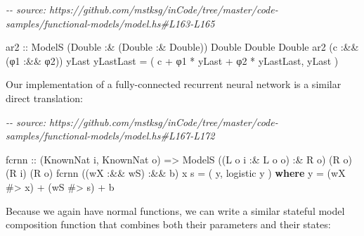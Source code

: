 \documentclass[]{article}
\newenvironment{Shaded}{}{}
\newcommand{\CommentTok}[1]{\textcolor[rgb]{0.38,0.63,0.69}{\textit{#1}}}
\newcommand{\DataTypeTok}[1]{\textcolor[rgb]{0.56,0.13,0.00}{#1}}
\newcommand{\KeywordTok}[1]{\textcolor[rgb]{0.00,0.44,0.13}{\textbf{#1}}}
\newcommand{\NormalTok}[1]{#1}
\newcommand{\OperatorTok}[1]{\textcolor[rgb]{0.40,0.40,0.40}{#1}}
\newcommand{\OtherTok}[1]{\textcolor[rgb]{0.00,0.44,0.13}{#1}}
\begin{document}
\begin{Shaded}
\begin{Highlighting}[]
\CommentTok{{-}{-} source: https://github.com/mstksg/inCode/tree/master/code{-}samples/functional{-}models/model.hs\#L163{-}L165}

\OtherTok{ar2 ::} \DataTypeTok{ModelS}\NormalTok{ (}\DataTypeTok{Double} \OperatorTok{:\&}\NormalTok{ (}\DataTypeTok{Double} \OperatorTok{:\&} \DataTypeTok{Double}\NormalTok{)) }\DataTypeTok{Double} \DataTypeTok{Double} \DataTypeTok{Double}
\NormalTok{ar2 (c }\OperatorTok{:\&\&}\NormalTok{ (φ1 }\OperatorTok{:\&\&}\NormalTok{ φ2)) yLast yLastLast }\OtherTok{=}
\NormalTok{    ( c }\OperatorTok{+}\NormalTok{ φ1 }\OperatorTok{*}\NormalTok{ yLast }\OperatorTok{+}\NormalTok{ φ2 }\OperatorTok{*}\NormalTok{ yLastLast, yLast )}
\end{Highlighting}
\end{Shaded}

Our implementation of a fully-connected recurrent neural network is a similar
direct translation:

\begin{Shaded}
\begin{Highlighting}[]
\CommentTok{{-}{-} source: https://github.com/mstksg/inCode/tree/master/code{-}samples/functional{-}models/model.hs\#L167{-}L172}

\NormalTok{fcrnn}
\OtherTok{    ::}\NormalTok{ (}\DataTypeTok{KnownNat}\NormalTok{ i, }\DataTypeTok{KnownNat}\NormalTok{ o)}
    \OtherTok{=\textgreater{}} \DataTypeTok{ModelS}\NormalTok{ ((}\DataTypeTok{L}\NormalTok{ o i }\OperatorTok{:\&} \DataTypeTok{L}\NormalTok{ o o) }\OperatorTok{:\&} \DataTypeTok{R}\NormalTok{ o) (}\DataTypeTok{R}\NormalTok{ o) (}\DataTypeTok{R}\NormalTok{ i) (}\DataTypeTok{R}\NormalTok{ o)}
\NormalTok{fcrnn ((wX }\OperatorTok{:\&\&}\NormalTok{ wS) }\OperatorTok{:\&\&}\NormalTok{ b) x s }\OtherTok{=}\NormalTok{ ( y, logistic y )}
  \KeywordTok{where}
\NormalTok{    y  }\OtherTok{=}\NormalTok{ (wX }\OperatorTok{\#\textgreater{}}\NormalTok{ x) }\OperatorTok{+}\NormalTok{ (wS }\OperatorTok{\#\textgreater{}}\NormalTok{ s) }\OperatorTok{+}\NormalTok{ b}
\end{Highlighting}
\end{Shaded}

Because we again have normal functions, we can write a similar stateful model
composition function that combines both their parameters and their states:
\end{document}
